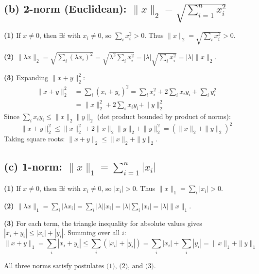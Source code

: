 \subsection*{(b) 2-norm (Euclidean): $\|x\|_2 = \sqrt{\sum_{i=1}^n x_i^2}$}

\textbf{(1)} If $x \neq 0$, then $\exists i$ with $x_i \neq 0$, so $\sum_i x_i^2 > 0$. Thus $\|x\|_2 = \sqrt{\sum_i x_i^2} > 0$.

\textbf{(2)} $\|\lambda x\|_2 = \sqrt{\sum_i (\lambda x_i)^2} = \sqrt{\lambda^2 \sum_i x_i^2} = |\lambda| \sqrt{\sum_i x_i^2} = |\lambda| \|x\|_2$.

\textbf{(3)} Expanding $\|x + y\|_2^2$:
\begin{align*}
\|x + y\|_2^2 &= \sum_i (x_i + y_i)^2 = \sum_i x_i^2 + 2\sum_i x_i y_i + \sum_i y_i^2 \\
&= \|x\|_2^2 + 2\sum_i x_i y_i + \|y\|_2^2
\end{align*}
Since $\sum_i x_i y_i \leq \|x\|_2 \|y\|_2$ (dot product bounded by product of norms):
$$\|x + y\|_2^2 \leq \|x\|_2^2 + 2\|x\|_2 \|y\|_2 + \|y\|_2^2 = (\|x\|_2 + \|y\|_2)^2$$
Taking square roots: $\|x + y\|_2 \leq \|x\|_2 + \|y\|_2$.

\subsection*{(c) 1-norm: $\|x\|_1 = \sum_{i=1}^n |x_i|$}

\textbf{(1)} If $x \neq 0$, then $\exists i$ with $x_i \neq 0$, so $|x_i| > 0$. Thus $\|x\|_1 = \sum_i |x_i| > 0$.

\textbf{(2)} $\|\lambda x\|_1 = \sum_i |\lambda x_i| = \sum_i |\lambda| |x_i| = |\lambda| \sum_i |x_i| = |\lambda| \|x\|_1$.

\textbf{(3)} For each term, the triangle inequality for absolute values gives $|x_i + y_i| \leq |x_i| + |y_i|$. Summing over all $i$:
$$\|x + y\|_1 = \sum_i |x_i + y_i| \leq \sum_i (|x_i| + |y_i|) = \sum_i |x_i| + \sum_i |y_i| = \|x\|_1 + \|y\|_1$$

\vspace{1em}
\noindent $\boxed{\text{All three norms satisfy postulates (1), (2), and (3).}}$
